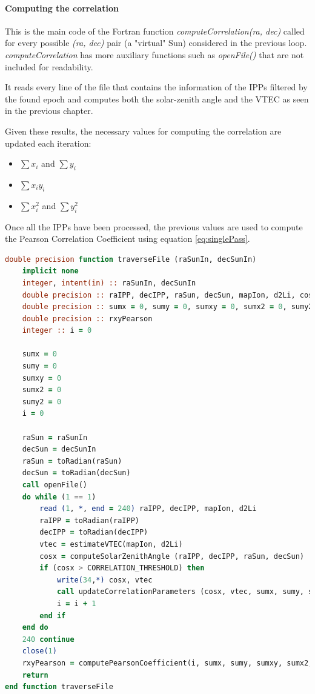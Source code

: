 \paragraph{Computing the correlation}

This is the main code of the Fortran function \textit{computeCorrelation(ra, dec)} called for every possible \textit{(ra, dec)} pair (a "virtual" Sun) considered in the previous loop. \textit{computeCorrelation} has more auxiliary functions such as \textit{openFile()} that are not included for readability.

It reads every line of the file that contains the information of the IPPs filtered by the found epoch and computes both the solar-zenith angle and the VTEC as seen in the previous chapter.

Given these results, the necessary values for computing the correlation are updated each iteration:

\begin{itemize}
	\item $\sum x_{i}$ and $\sum y_{i}$
	\item $\sum x_{i}y_{i}$
	\item $\sum x_{i}^{2}$ and $\sum y_{i}^{2}$
\end{itemize}


Once all the IPPs have been processed, the previous values are used to compute the Pearson Correlation Coefficient using equation \ref{eq:singlePass}.

\begin{lstlisting}[language=Fortran, caption=Correlation computation]
double precision function traverseFile (raSunIn, decSunIn)
	implicit none
	integer, intent(in) :: raSunIn, decSunIn
	double precision :: raIPP, decIPP, raSun, decSun, mapIon, d2Li, cosX, vtec
	double precision :: sumx = 0, sumy = 0, sumxy = 0, sumx2 = 0, sumy2 = 0
	double precision :: rxyPearson
	integer :: i = 0
	
	sumx = 0
	sumy = 0
	sumxy = 0
	sumx2 = 0
	sumy2 = 0
	i = 0
	
	raSun = raSunIn
	decSun = decSunIn
	raSun = toRadian(raSun)
	decSun = toRadian(decSun)
	call openFile()
	do while (1 == 1)
		read (1, *, end = 240) raIPP, decIPP, mapIon, d2Li
		raIPP = toRadian(raIPP)
		decIPP = toRadian(decIPP)
		vtec = estimateVTEC(mapIon, d2Li)
		cosx = computeSolarZenithAngle (raIPP, decIPP, raSun, decSun)
		if (cosx > CORRELATION_THRESHOLD) then
			write(34,*) cosx, vtec
			call updateCorrelationParameters (cosx, vtec, sumx, sumy, sumxy, sumx2, sumy2)
			i = i + 1
		end if	
	end do
	240 continue
	close(1)
	rxyPearson = computePearsonCoefficient(i, sumx, sumy, sumxy, sumx2, sumy2)
	return
end function traverseFile
\end{lstlisting}

